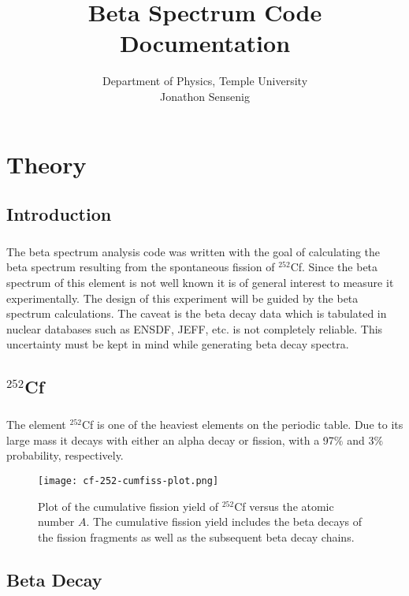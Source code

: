 \documentclass{report}
\begin{document}
\title{Beta Spectrum Code Documentation}
\author{Department of Physics, Temple University\\ Jonathon Sensenig}
\maketitle
\chapter{Theory}
\section{Introduction}
\paragraph{}
The beta spectrum analysis code was written with the goal of calculating the beta spectrum
resulting from the spontaneous fission of $^{252}$Cf. Since the beta spectrum of this element
is not well known it is of general interest to measure it experimentally. The design of this
experiment will be guided by the beta spectrum calculations. The caveat is the beta decay 
data which is tabulated in nuclear databases such as ENSDF, JEFF, etc. is not completely 
reliable. This uncertainty must be kept in mind while generating beta decay spectra. 
\section{$^{252}$Cf}
\paragraph{}
The element $^{252}$Cf is one of the heaviest elements on the periodic table. Due to its large
mass it decays with either an alpha decay or fission, with a 97$\%$ and 3$\%$ probability, respectively.

\begin{figure}[H]
    \centering
        \texttt{[image: cf-252-cumfiss-plot.png]}
        \caption{Plot of the cumulative fission yield of $^{252}$Cf versus the atomic number $A$. 
The cumulative fission yield includes the beta decays of the fission fragments as well as the
 subsequent beta decay chains.}
\end{figure}


\section{Beta Decay}
\end{document}
